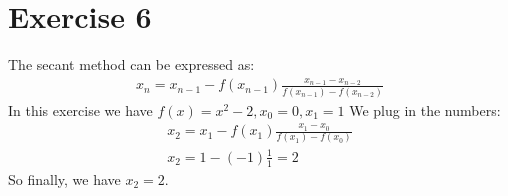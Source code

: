 \section{Exercise 6}
The secant method can be expressed as:
\begin{gather*}
x_n = x_{n-1} - f(x_{n-1})\frac{x_{n-1}-x_{n-2}}{f(x_{n-1})-f(x_{n-2})}
\end{gather*}
In this exercise we have $f(x) = x^2 -2, x_0 = 0, x_1 = 1$
We plug in the numbers:
\begin{gather*}
x_2 = x_1 - f(x_1) \frac{x_1-x_0}{f(x_1) - f(x_0)}\\
x_2 = 1 - (-1)\frac{1}{1} = 2
\end{gather*}
So finally, we have $x_2 = 2$.